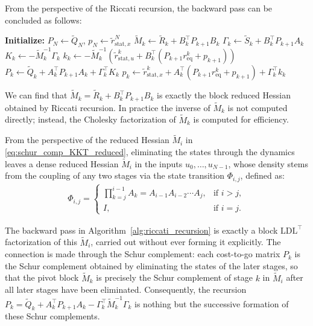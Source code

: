 \documentclass[class=scrbook, crop=false]{standalone}
\begin{document}
From the perspective of the Riccati recursion, the backward pass can be concluded as follows:
\begin{algorithm}[H]
\caption{Backward Pass of Riccati Recursion}
\label{alg:riccati_recursion_backward}
\begin{algorithmic}[1]
\State\textbf{Initialize:} $P_N \gets \tilde{Q}_N$, $p_N \gets \tilde{r}_{\mathrm{stat}, x}^N$
\Statex 
{}
    \State $\tilde{M}_k \gets \tilde{R}_k + B_k^\top P_{k+1} B_k$
    \State $\Gamma_k \gets \tilde{S}_k + B_k^\top P_{k+1} A_k$
    \State $K_k \gets -\tilde{M}_k^{-1} \Gamma_k$
    \State $k_k \gets -\tilde{M}_k^{-1} \left(\tilde{r}_{\mathrm{stat}, u}^k + B_k^\top (P_{k+1} r_{\mathrm{eq}}^k + p_{k+1})\right)$
    \State $P_k \gets \tilde{Q}_k + A_k^\top P_{k+1} A_k + \Gamma_k^\top K_k$
    \State $p_k \gets \tilde{r}_{\mathrm{stat}, x}^k + A_k^\top (P_{k+1} r_{\mathrm{eq}}^k + p_{k+1}) + \Gamma_k^\top k_k$
\EndFor
\end{algorithmic}
\end{algorithm}
We can find that $\tilde{M}_k = \tilde{R}_k + B_k^\top P_{k+1} B_k$ is exactly the block reduced Hessian obtained by Riccati recursion.
In practice the inverse of $\tilde{M}_k$ is not computed directly; instead, the Cholesky factorization of $\tilde{M}_k$ is computed for efficiency.

From the perspective of the reduced Hessian $\tilde{M}_i$ in \eqref{eq:schur_comp_KKT_reduced}, 
eliminating the states through the dynamics leaves a dense reduced Hessian $\tilde{M}_i$ in the inputs $u_0, \dots, u_{N-1}$, 
whose density stems from the coupling of any two stages via the state transition $\Phi_{i, j}$, defined as:
\begin{align*}
    \Phi_{i, j} = \begin{cases}
    \prod_{k=j}^{i-1} A_k = A_{i-1} A_{i-2} \cdots A_j, & \text{if } i > j, \\
    I, & \text{if } i = j.
    \end{cases}
\end{align*}

The backward pass in Algorithm~\ref{alg:riccati_recursion} is exactly a block $\mathrm{LD}\mathrm{L}^\top$ factorization of this $\tilde{M}_i$, 
carried out without ever forming it explicitly. The connection is made through the Schur complement: 
each cost-to-go matrix $P_k$ is the Schur complement obtained by eliminating the states of the later stages, 
so that the pivot block $\tilde{M}_k$ is precisely the Schur complement of stage $k$ in $\tilde{M}_i$ after all later stages have been eliminated. 
Consequently, the recursion $P_k = \tilde{Q}_k + A_k^\top P_{k+1} A_k - \Gamma_k^\top \tilde{M}_k^{-1} \Gamma_k$ is nothing but the successive formation of these Schur complements.
\end{document}
